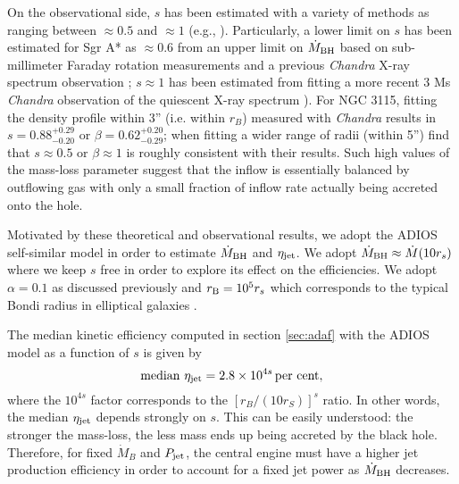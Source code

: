 \documentclass[useAMS,usenatbib]{mn2e}
\begin{document}
On the observational side, $s$ has been estimated with a variety of methods as ranging between $\approx 0.5$ and $\approx 1$ (e.g., \citealt{Baganoff03,Marrone07,Wang13,Wong11,Wong14,Kuo14}). Particularly, a lower limit on $s$ has been estimated for Sgr A* as $\approx 0.6$ from an upper limit on $\dot{M}_{\rm BH}$ based on sub-millimeter Faraday rotation measurements \citep{Marrone07} and a previous \emph{Chandra} X-ray spectrum observation \citep{Baganoff03}; $s \approx 1$ has been estimated from fitting a more recent 3 Ms \emph{Chandra} observation of the quiescent X-ray spectrum \citep{Wang13}). For NGC 3115, fitting the density profile within 3'' (i.e. within $r_B$) measured with \emph{Chandra} results in $s=0.88^{+0.29}_{-0.20}$ or $\beta=0.62^{+0.20}_{-0.29}$; when fitting a wider range of radii (within 5'') \cite{Wong14} find that $s \approx 0.5$ or $\beta \approx 1$ is roughly consistent with their results.
Such high values of the mass-loss parameter suggest that the inflow is essentially balanced by outflowing gas with only a small fraction of inflow rate actually being accreted onto the hole.

Motivated by these theoretical and observational results, we adopt the ADIOS self-similar model in order to estimate $\dot{M}_{\rm BH}$  and $\eta_{\rm jet}$. We adopt $\dot{M}_{\rm BH} \approx \dot{M}(10 r_s)$ where we keep $s$ free in order to explore its effect on the efficiencies. We adopt $\alpha=0.1$ as discussed previously and $r_{\rm B} = 10^5 r_s$ which corresponds to the typical Bondi radius in elliptical galaxies \citep{Di-Matteo03}. 

The median kinetic efficiency computed in section \ref{sec:adaf} with the ADIOS model as a function of $s$ is given by 
\begin{equation}
{\rm median} \ \eta_{\rm jet}=  2.8 \times 10^{4s}  \, {\rm per \ cent},
\end{equation}
where the $10^{4s}$ factor corresponds to the $\left[ r_B/(10 r_S) \right]^s$ ratio. In other words, the median $\eta_{\rm jet}$ depends strongly on $s$. This can be easily understood: the stronger the mass-loss, the less mass ends up being accreted by the black hole. Therefore, for fixed $\dot{M}_B$ and $P_{\rm jet}$, the central engine must have a higher jet production efficiency in order to account for a fixed jet power as $\dot{M}_{\rm BH}$ decreases.
\end{document}
